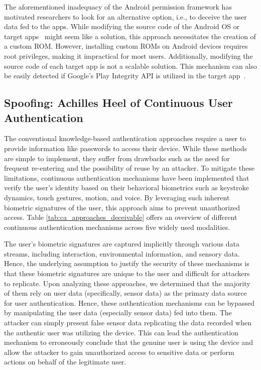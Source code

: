 The aforementioned inadequacy of the Android permission framework has motivated researchers to look for an alternative option, i.e., to deceive the user data fed to the apps. While modifying the source code of the Android OS or target apps~\cite{backes2015boxify, jeon2012dr, raval2016you, smalley2013security, wu2017context} might seem like a solution, this approach necessitates the creation of a custom ROM. However, installing custom ROMs on Android devices requires root privileges, making it impractical for most users. Additionally, modifying the source code of each target app is not a scalable solution. This mechanism can also be easily detected if Google's Play Integrity API is utilized in the target app~\cite{andPlayIntAPI}.



\subsection{Spoofing: Achilles Heel of Continuous User Authentication}
\label{sec:continuous_authentication_mechanisms}

The conventional knowledge-based authentication approaches require a user to provide information like passwords to access their device. While these methods are simple to implement, they suffer from drawbacks such as the need for frequent re-entering and the possibility of reuse by an attacker. To mitigate these limitations, continuous authentication mechanisms have been implemented that verify the user's identity based on their behavioral biometrics such as keystroke dynamics, touch gestures, motion, and voice. By leveraging such inherent biometric signatures of the user, this approach aims to prevent unauthorized access. Table \ref{tab:ca_approaches_deceivable} offers an overview of different continuous authentication mechanisms across five widely used modalities. 

The user's biometric signatures are captured implicitly through various data streams, including interaction, environmental information, and sensory data. Hence, the underlying assumption to justify the security of these mechanisms is that these biometric signatures are unique to the user and difficult for attackers to replicate. Upon analyzing these approaches, we determined that the majority of them rely on user data (specifically, sensor data) as the primary data source for user authentication. Hence, these authentication mechanisms can be bypassed by manipulating the user data (especially sensor data) fed into them. The attacker can simply present false sensor data replicating the data recorded when the authentic user was utilizing the device. This can lead the authentication mechanism to erroneously conclude that the genuine user is using the device and allow the attacker to gain unauthorized access to sensitive data or perform actions on behalf of the legitimate user. 

